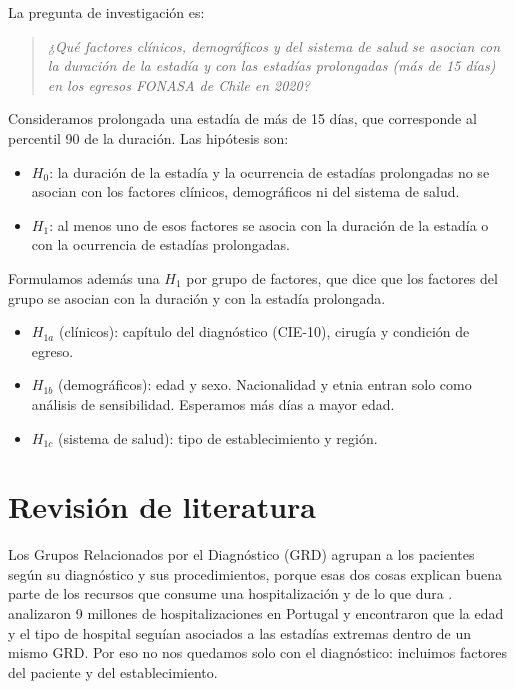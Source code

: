 \documentclass[10.5pt,a4paper,headings=small,abstract=false]{scrartcl}
\newcommand{\cie}{\mbox{CIE-10}}
\begin{document}
La pregunta de investigación es:

\begin{quote}
\emph{¿Qué factores clínicos, demográficos y del sistema de salud se asocian con la duración de la estadía y con las estadías prolongadas (más de 15 días) en los egresos FONASA de Chile en 2020?}
\end{quote}

Consideramos prolongada una estadía de más de 15 días, que corresponde al percentil 90 de la duración. Las hipótesis son:

\begin{itemize}\setlength\itemsep{0pt}
\item $H_0$: la duración de la estadía y la ocurrencia de estadías prolongadas no se asocian con los factores clínicos, demográficos ni del sistema de salud.
\item $H_1$: al menos uno de esos factores se asocia con la duración de la estadía o con la ocurrencia de estadías prolongadas.
\end{itemize}

Formulamos además una $H_1$ por grupo de factores, que dice que los factores del grupo se asocian con la duración y con la estadía prolongada.

\begin{itemize}\setlength\itemsep{0pt}
\item $H_{1a}$ (clínicos): capítulo del diagnóstico (\cie), cirugía y condición de egreso.
\item $H_{1b}$ (demográficos): edad y sexo. Nacionalidad y etnia entran solo como análisis de sensibilidad. Esperamos más días a mayor edad.
\item $H_{1c}$ (sistema de salud): tipo de establecimiento y región.
\end{itemize}

\section{Revisión de literatura}

Los Grupos Relacionados por el Diagnóstico (GRD) agrupan a los pacientes según su diagnóstico y sus procedimientos, porque esas dos cosas explican buena parte de los recursos que consume una hospitalización y de lo que dura \citep{fetter1980}. \citet{freitas2012} analizaron 9 millones de hospitalizaciones en Portugal y encontraron que la edad y el tipo de hospital seguían asociados a las estadías extremas dentro de un mismo GRD. Por eso no nos quedamos solo con el diagnóstico: incluimos factores del paciente y del establecimiento.
\end{document}

